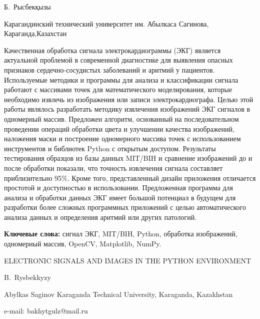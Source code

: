 
\begin{header}

Б.~Рысбекқызы
\end{header}

\begin{affil}
Карагандинский технический университет им. Абылкаса Сагинова, Караганда,Казахстан

\end{affil}

Качественная обработка сигнала электрокардиограммы (ЭКГ) является
актуальной проблемой в современной диагностике для выявления опасных
признаков сердечно-сосудистых заболеваний и аритмий у пациентов.
Используемые методики и программы для анализа и классификации сигнала
работают с массивами точек для математического моделирования, которые
необходимо извлечь из изображения или записи электрокардиографа. Целью
этой работы являлось разработать методику извлечения изображений ЭКГ
сигналов в одномерный массив. Предложен алгоритм, основанный на
последовательном проведении операций обработки цвета и улучшении
качества изображений, наложения маски и построение одномерного массива
точек с использованием инструментов и библиотек Python с открытым
доступом. Результаты тестирования образцов из базы данных MIT/BIH и
сравнение изображений до и после обработки показали, что точность
извлечения сигнала составляет приблизительно 95\%. Кроме того,
представленный дизайн приложения отличается простотой и доступностью в
использовании. Предложенная программа для анализа и обработки данных ЭКГ
имеет большой потенциал в будущем для разработки более сложных
программных приложений с целью автоматического анализа данных и
определения аритмий или других патологий.

{\bfseries Ключевые слова:} сигнал ЭКГ, MIT/BIH, Python, обработка
изображений, одномерный массив, OpenCV, Matplotlib, NumPy.

\begin{header}
ELECTRONIC SIGNALS AND IMAGES IN THE PYTHON ENVIRONMENT

B.~Rysbekkyzy
\end{header}

\begin{affil}
Abylkas Saginov Karaganda Technical University, Karaganda, Kazakhstan

e-mail: bakhytgulz@mail.ru
\end{affil}

